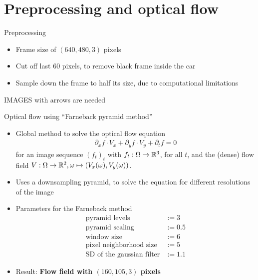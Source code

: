 \section{Preprocessing and optical flow}

\begin{frame}{Preprocessing}
    \begin{itemize}
    \item Frame size of $(640,480,3)$ pixels
    \item Cut off last 60 pixels, to remove black frame inside the car
    \item Sample down the frame to half its size, due to computational limitations
    \end{itemize}
    IMAGES with arrows are needed
\end{frame}

\begin{frame}{Optical flow using \enquote{Farneback pyramid method}\cite{Farneback2003}}

\begin{itemize}
\item Global method to solve the optical flow equation
\begin{align*}
\partial_x f \cdot V_x + \partial_y f \cdot  V_y + \partial_t f  = 0
\end{align*}
for an image sequence $(f_t)_t$ with $f_t : \Omega \to {\mathbb{R}}^3$, for all $t$, and the (dense) flow field $V : \Omega \to {\mathbb{R}}^2, \omega \mapsto (V_x(\omega), V_y(\omega))$.
\item Uses a downsampling pyramid, to solve the equation for different resolutions of the image
\item Parameters for the Farneback method
\begin{align*}
\text{pyramid levels} &:= 3\\
\text{pyramid scaling} &:= 0.5\\
\text{window size} &:= 6\\
\text{pixel neighborhood size} &:= 5\\
\text{SD of the gaussian filter} &:= 1.1
\end{align*}
\item Result: \textbf{Flow field with $(160,105,3)$ pixels}
\end{itemize}
\end{frame}


